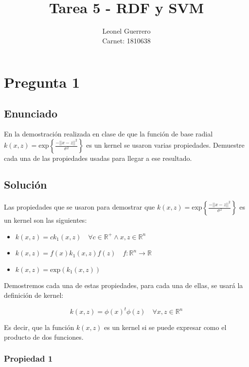 \documentclass{article}
\title{Tarea 5 - RDF y SVM}
\author{Leonel Guerrero \\ Carnet: 1810638}
\theoremstyle{mytheoremstyle}
\theoremstyle{mytheoremstyle}
\theoremstyle{myproblemstyle}
\begin{document}
\maketitle

\section*{Pregunta 1}

\subsection*{Enunciado}
En la demostración realizada en clase de que la función de base radial $k(x, z) = \text{exp}\left\{ \frac{-||x-z||^2}{\sigma^2} \right\}$ es un kernel se usaron varias propiedades. Demuestre cada una de las propiedades usadas para llegar a ese resultado.

\subsection*{Solución}

Las propiedades que se usaron para demostrar que $k(x, z) = \text{exp}\left\{ \frac{-||x-z||^2}{\sigma^2} \right\}$ es un kernel son las siguientes:

\begin{itemize}
  \item $k(x, z) = ck_1(x, z) \quad \forall c \in \mathbb{R^+} \land x, z \in \mathbb{R}^n$
  \item $k(x, z) = f(x)k_1(x, z)f(z) \quad f: \mathbb{R}^n \rightarrow \mathbb{R}$
  \item $k(x, z) = \text{exp}(k_1(x, z))$
\end{itemize}

Demostremos cada una de estas propiedades, para cada una de ellas, se usará la  definición de kernel:

\begin{equation*}
  k(x, z) = \phi(x)^t\phi(z) \quad \forall x, z \in \mathbb{R}^n
\end{equation*}

Es decir, que la función $k(x, z)$ es un kernel si se puede expresar como el producto de dos funciones.

\subsubsection*{Propiedad 1}
\end{document}

